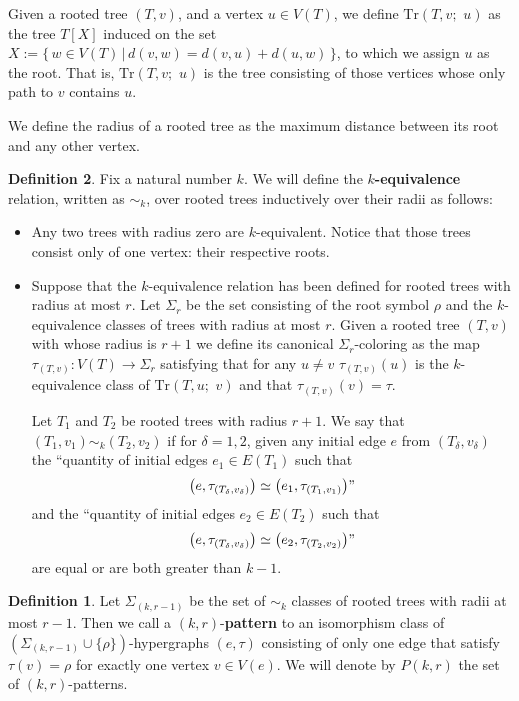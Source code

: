 \documentclass[12pt,notitlepage,a4paper]{article}
\theoremstyle{definition}
\newtheorem{definition}{Definition}[section]
\begin{document}
%
Given a rooted tree $(T, v)$, and a vertex $u\in V(T)$, 
we define $\mathrm{Tr}(T,v;\,\, u)$ as the tree $T[X]$ induced on the
set $X:=\{ \, w\in V(T) \, | \, d(v,w)=d(v,u)+ d(u,w) \,  \}
$, to which we assign $u$ as the root.
That is, $\mathrm{Tr}(T,v;\,\, u)$ is the tree consisting of those vertices
whose only path to $v$ contains $u$.
\par
We define the radius of a rooted tree
as the maximum distance between its root
and any other vertex. \par

\begin{definition}

Fix a natural number $k$. We will define the
\textbf{$k$-equivalence} relation, written as 
$\sim_k$,  over rooted trees
inductively over their radii as follows:

\begin{itemize}
	\item Any two trees with radius zero are $k$-equivalent.
	Notice that those trees
	consist only of one vertex: their respective roots.
	
	\item Suppose that the $k$-equivalence relation has been
	defined for rooted trees with radius at most $r$. Let $\Sigma_r$
	be the set consisting of the root symbol $\rho$ and
	the $k$-equivalence classes of trees with radius at most $r$.
	Given a rooted tree $(T,v)$ with whose radius is $r+1$
	we define its canonical $\Sigma_r$-coloring as the map 
	$\tau_{(T,v)}: V(T)\rightarrow \Sigma_r$ satisfying that
	for any $u\neq v$ $\tau_{(T,v)}(u)$ is the $k$-equivalence class 
	of $\mathrm{Tr}(T,u;\, \,v)$ and that $\tau_{(T,v)}(v)=\tau$. \par
	Let $T_1$ and $T_2$ be rooted trees with radius $r+1$. 
	We say that $(T_1,v_1)\sim_k (T_2,v_2)$ 
	if for $\delta=1,2$, given any initial edge $e$ from $(T_\delta,v_\delta)$
	the
	``quantity of initial edges $e_1\in E(T_1)$ such that
	\[
	\big(e,\tau_{(T_\delta,v_\delta)}\big)
	\simeq \big(e_1,\tau_{(T_1,v_1)}\big)" 
	\] and the
	``quantity of initial edges $e_2\in E(T_2)$ such that
	\[
	\big(e,\tau_{(T_\delta,v_\delta)}\big)
	\simeq \big(e_2,\tau_{(T_2,v_2)}\big)"\] are equal or
	are both greater than $k-1$.
\end{itemize}


\begin{definition}
	Let $\Sigma_{(k,r-1)}$ be the set of $\sim_k$ classes
	of rooted trees with radii at most $r-1$. Then
	we call a $(k,r)$-\textbf{pattern} to an isomorphism class
	of $(\Sigma_{(k,r-1)}\cup \{\rho \})$-hypergraphs 
	$(e,\tau)$ consisting of only one edge that satisfy 
	$\tau(v)=\rho$ for exactly one vertex $v\in V(e)$. We will
	denote by $P(k,r)$ the set of $(k,r)$-patterns.
\end{definition}


\end{definition}
\end{document}
